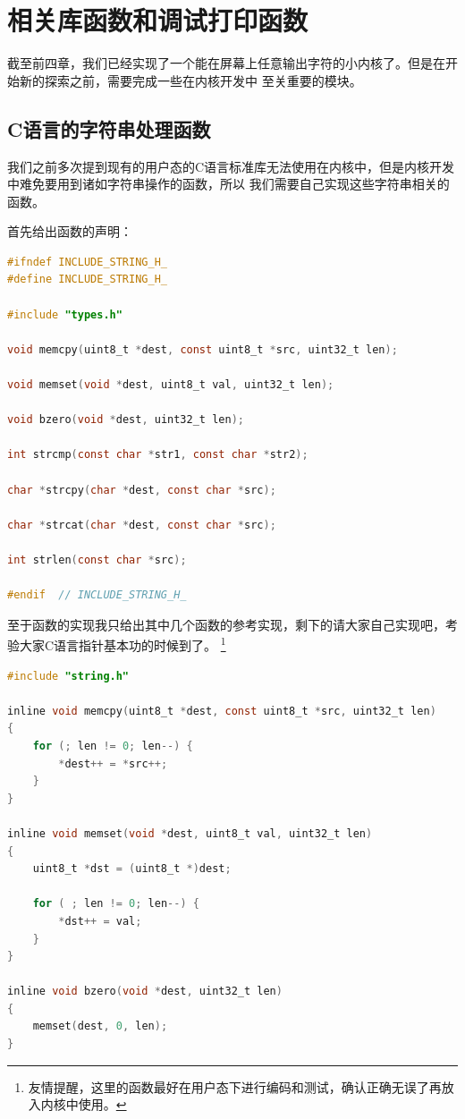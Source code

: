 
\section {相关库函数和调试打印函数}

\par 截至前四章，我们已经实现了一个能在屏幕上任意输出字符的小内核了。但是在开始新的探索之前，需要完成一些在内核开发中\allowbreak
至关重要的模块。

\subsection {C语言的字符串处理函数}

\par 我们之前多次提到现有的用户态的C语言标准库无法使用在内核中，但是内核开发中难免要用到诸如字符串操作的函数，所以\allowbreak
我们需要自己实现这些字符串相关的函数。

\par 首先给出函数的声明：

\begin{lstlisting}[language = C, label = include/string.h, caption = include/string.h]
#ifndef INCLUDE_STRING_H_
#define INCLUDE_STRING_H_

#include "types.h"

void memcpy(uint8_t *dest, const uint8_t *src, uint32_t len);

void memset(void *dest, uint8_t val, uint32_t len);

void bzero(void *dest, uint32_t len);

int strcmp(const char *str1, const char *str2);

char *strcpy(char *dest, const char *src);

char *strcat(char *dest, const char *src);

int strlen(const char *src);

#endif 	// INCLUDE_STRING_H_
\end{lstlisting}

\par 至于函数的实现我只给出其中几个函数的参考实现，剩下的请大家自己实现吧，考验大家C语言指针基本功的时候到了。\allowbreak
\footnote{友情提醒，这里的函数最好在用户态下进行编码和测试，确认正确无误了再放入内核中使用。}

\begin{lstlisting}[language = C, label = libs/string.c, caption = libs/string.c]
#include "string.h"

inline void memcpy(uint8_t *dest, const uint8_t *src, uint32_t len)
{
	for (; len != 0; len--) {
		*dest++ = *src++;
	}
}

inline void memset(void *dest, uint8_t val, uint32_t len)
{
	uint8_t *dst = (uint8_t *)dest;

	for ( ; len != 0; len--) {
		*dst++ = val;
	}
}

inline void bzero(void *dest, uint32_t len)
{
	memset(dest, 0, len);
}
\end{lstlisting}

